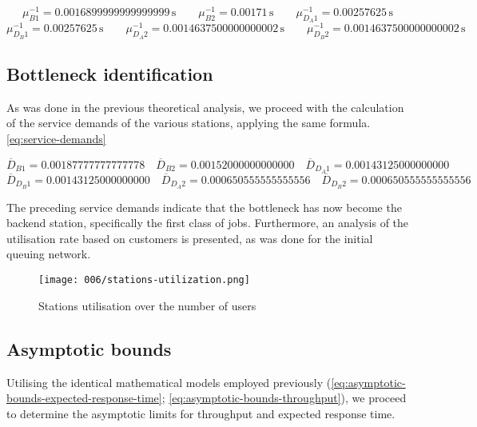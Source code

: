 \[
\mu^{-1}_{B1} = \num[round-mode=places, round-precision=5]{0.0016899999999999999} \, \text{s}
\quad \quad
\mu^{-1}_{B2} = \num[round-mode=places, round-precision=5]{0.00171} \, \text{s}
\quad \quad
\mu^{-1}_{D_{A}1} = \num[round-mode=places, round-precision=5]{0.00257625} \, \text{s}
\]
\[
\mu^{-1}_{D_{B}1} = \num[round-mode=places, round-precision=5]{0.00257625} \, \text{s}
\quad \quad
\mu^{-1}_{D_{A}2} = \num[round-mode=places, round-precision=5]{0.0014637500000000002} \, \text{s}
\quad \quad
\mu^{-1}_{D_{B}2} = \num[round-mode=places, round-precision=5]{0.0014637500000000002} \, \text{s}
\]

\subsection{Bottleneck identification}

As was done in the previous theoretical analysis, we proceed with the calculation of the service demands of the various stations, applying the same formula. \ref{eq:service-demands}

\[
\overline{D}_{B1} = \num[round-mode=places, round-precision=5]{0.00187777777777778}
\quad
\overline{D}_{B2} = \num[round-mode=places, round-precision=5]{0.00152000000000000}
\quad
\overline{D}_{D_{A}1} = \num[round-mode=places, round-precision=5]{0.00143125000000000}
\]
\[
\overline{D}_{D_{B}1} = \num[round-mode=places, round-precision=5]{0.00143125000000000}
\quad
\overline{D}_{D_{A}2}  = \num[round-mode=places, round-precision=5]{0.000650555555555556}
\quad
\overline{D}_{D_{B}2} = \num[round-mode=places, round-precision=5]{0.000650555555555556}
\]

The preceding service demands indicate that the bottleneck has now become the backend station, specifically the first class of jobs.
Furthermore, an analysis of the utilisation rate based on customers is presented, as was done for the initial queuing network.

\begin{figure}[h]
	\centering
	\texttt{[image: 006/stations-utilization.png]}
	\caption{Stations utilisation over the number of users}
\end{figure}

\subsection{Asymptotic bounds}

Utilising the identical mathematical models employed previously (\ref{eq:asymptotic-bounds-expected-response-time}; \ref{eq:asymptotic-bounds-throughput}), we proceed to determine the asymptotic limits for throughput and expected response time.


